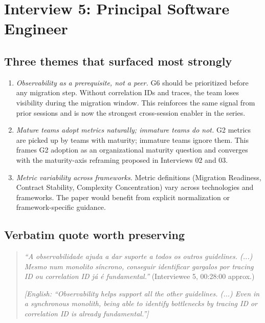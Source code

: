 
\section{Interview 5: Principal Software Engineer}
\label{sec:interview05}

\subsection*{Three themes that surfaced most strongly}

\begin{enumerate}[itemsep=3pt,topsep=2pt]
  \item \emph{Observability as a prerequisite, not a peer.} G6 should be prioritized before any migration step. Without correlation IDs and traces, the team loses visibility during the migration window. This reinforces the same signal from prior sessions and is now the strongest cross-session enabler in the series.
  \item \emph{Mature teams adopt metrics naturally; immature teams do not.} G2 metrics are picked up by teams with maturity; immature teams ignore them. This frames G2 adoption as an organizational maturity question and converges with the maturity-axis reframing proposed in Interviews 02 and 03.
  \item \emph{Metric variability across frameworks.} Metric definitions (Migration Readiness, Contract Stability, Complexity Concentration) vary across technologies and frameworks. The paper would benefit from explicit normalization or framework-specific guidance.
\end{enumerate}

\subsection*{Verbatim quote worth preserving}

\begin{quote}
\emph{``A observabilidade ajuda a dar suporte a todos os outros guidelines. (...) Mesmo num monolito síncrono, conseguir identificar gargalos por tracing ID ou correlation ID já é fundamental.''} (Interviewee 5, 00:28:00 approx.)

\medskip

\emph{[English: ``Observability helps support all the other guidelines. (...) Even in a synchronous monolith, being able to identify bottlenecks by tracing ID or correlation ID is already fundamental.'']}
\end{quote}

